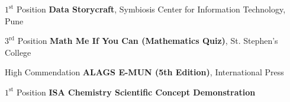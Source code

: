 {%
	$1^{\text{st}}$ Position}
{%
	\textbf{Data Storycraft}, Symbiosis Center for Information Technology, Pune}
{}{}

{%
	$3^{\text{rd}}$ Position}
{%
	\textbf{Math Me If You Can (Mathematics Quiz)}, St. Stephen's College}
{}{}

{%
	High Commendation}
{%
	\textbf{ALAGS E-MUN (5th Edition)}, International Press}
{}{}

{%
	$1^{\text{st}}$ Position}
{%
	\textbf{ISA Chemistry Scientific Concept Demonstration}}
{}{}
